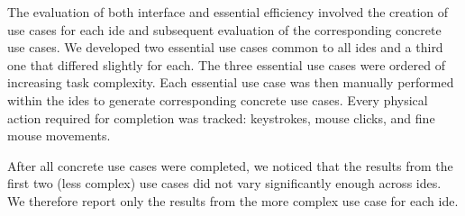 The evaluation of both interface and essential efficiency involved the creation of use cases for each \ac{ide} and subsequent evaluation of the corresponding concrete use cases.
We developed two essential use cases common to all \acp{ide} and a third one that differed slightly for each.
The three essential use cases were ordered of increasing task complexity.
Each essential use case was then manually performed within the \acp{ide} to generate corresponding concrete use cases.
Every physical action required for completion was tracked: keystrokes, mouse clicks, and fine mouse movements.

After all concrete use cases were completed, we noticed that the results from the first two (less complex) use cases did not vary significantly enough across \acp{ide}.
We therefore report only the results from the more complex use case for each \ac{ide}.
